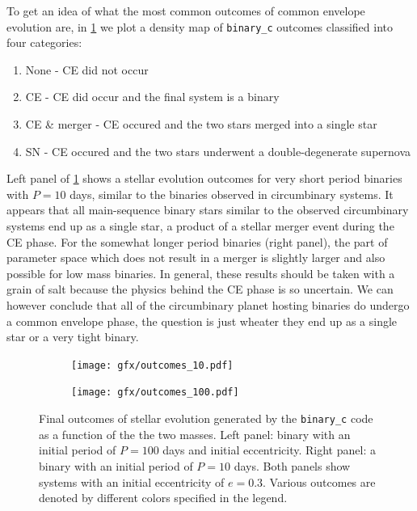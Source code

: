 \documentclass[ twoside,openright,titlepage,numbers=noenddot,headinclude,%
                footinclude=true,cleardoublepage=empty,abstractoff, %
                BCOR=5mm,paper=a4,fontsize=11pt,%
                american,%
                ]{scrreprt}
\begin{document}
To get an idea of what the most common outcomes
of common envelope evolution are, in \cref{fig:evolution_outcomes} we plot a density 
map of \texttt{binary\_c} outcomes classified into four categories:
\begin{enumerate}
    \item None - CE did not occur
    \item CE - CE did occur and the final system is a binary
    \item CE \& merger - CE occured and the two stars merged into a single star
    \item SN - CE occured and the two stars underwent a double-degenerate supernova
\end{enumerate}
Left panel of \cref{fig:evolution_outcomes} shows a stellar evolution 
outcomes for very short period binaries with
$P=10$ days, similar to the binaries observed in circumbinary systems.  
It appears that all main-sequence
binary stars similar to the observed circumbinary systems end up as a single star, a 
product of a stellar merger event during the CE phase. 
For the somewhat longer period binaries (right panel), the part of parameter space
which does not result in a merger is slightly larger and also possible for low 
mass binaries. In general, these results should be taken with a grain of salt 
because the physics behind the CE phase is so uncertain. We can however conclude
that all of the circumbinary planet hosting binaries do undergo a common envelope
phase, the question is just wheater they end up as a single star or a very tight 
binary.
\begin{figure}[t!]
\centering
\begin{subfigure}{0.52\textwidth}
  \centering
  \texttt{[image: gfx/outcomes\_10.pdf]}
\end{subfigure}%
\begin{subfigure}{0.52\textwidth}
  \centering
  \texttt{[image: gfx/outcomes\_100.pdf]}
\end{subfigure}
    \caption{Final outcomes of stellar evolution generated by the 
    \texttt{binary\_c} code as a function of the the two masses. Left panel: 
    binary with an initial period of $P=100$ days and initial eccentricity. 
    Right panel: a 
    binary with an initial period of $P=10$ days. Both panels show systems 
    with an initial eccentricity of $e=0.3$. Various outcomes are denoted
    by different colors specified in the legend.}
\label{fig:evolution_outcomes}
\end{figure}
\end{document}
